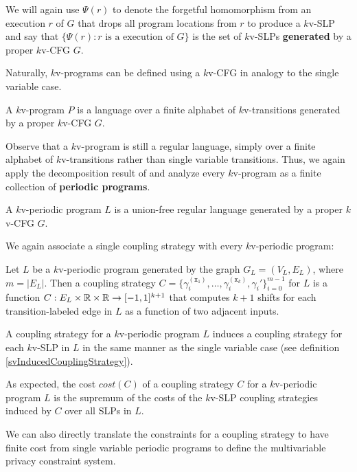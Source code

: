 We will again use $\Psi(r)$ to denote the forgetful homomorphism from an execution $r$ of $G$ that drops all program locations from $r$ to produce a $k$v-SLP and say that $\{\Psi(r): r\text{ is a execution of }G\}$ is the set of $k$v-SLPs \textbf{generated} by a proper $k$v-CFG $G$. 

Naturally, $k$v-programs can be defined using a $k$v-CFG in analogy to the single variable case. 

\begin{defn}
    A $k$v-program $P$ is a language over a finite alphabet of $k$v-transitions generated by a proper $k$v-CFG $G$. 
\end{defn}

Observe that a $k$v-program is still a regular language, simply over a finite alphabet of $k$v-transitions rather than single variable transitions. Thus, we again apply the decomposition result of \cite{afoninMinimalUnionFreeDecompositions2009} and analyze every $k$v-program as a finite collection of \textbf{periodic programs}.

\begin{defn}
    A $k$v-periodic program $L$ is a union-free regular language generated by a proper $k$v-CFG $G$. 
\end{defn}

We again associate a single coupling strategy with every $k$v-periodic program:

\begin{defn}
    Let $L$ be a $k$v-periodic program generated by the graph $G_L = (V_L, E_L)$, where $m = |E_L|$. Then a coupling strategy $C = \{\gamma_i^{(\texttt{x}_1)},\ldots, \gamma_i^{(\texttt{x}_k)}, \gamma_i'\}_{i=0}^{m-1}$ for $L$ is a function $C:E_L\times\mathbb{R} \times\mathbb{R}\to [-1, 1]^{k+1}$ that computes $k+1$ shifts for each transition-labeled edge in $L$ as a function of two adjacent inputs.
\end{defn}

A coupling strategy for a $k$v-periodic program $L$ induces a coupling strategy for each $k$v-SLP in $L$ in the same manner as the single variable case (see definition \ref{svInducedCouplingStrategy}). 

As expected, the cost $cost(C)$ of a coupling strategy $C$ for a $k$v-periodic program $L$ is the supremum of the costs of the $k$v-SLP coupling strategies induced by $C$ over all SLPs in $L$.

We can also directly translate the constraints for a coupling strategy to have finite cost from single variable periodic programs to define the multivariable privacy constraint system.

